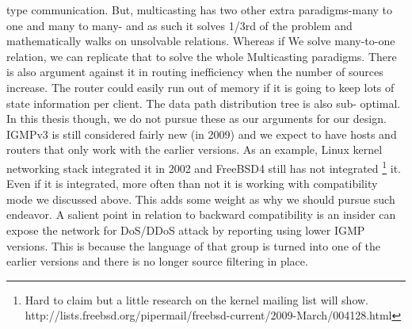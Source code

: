 \documentclass[11pt,left=2cm,bottom=2cm,oneside]{book}
\begin{document}
type communication. But, multicasting has two other extra paradigms-many to
one and many to many- and as such it solves 1/3rd of the problem and mathematically walks on unsolvable relations. Whereas if We solve many-to-one relation, we can replicate that to solve the whole Multicasting paradigms.
There is also argument against it in routing inefficiency when the number of
sources increase. The router could easily run out of memory if it is going to
keep
lots of state information per client. The data path distribution tree is also
sub-
optimal. In this thesis though, we do not pursue these as our arguments for
our
design. IGMPv3 is still considered fairly new (in 2009) and we expect to have
hosts and routers that only work with the earlier versions. As an example,
Linux
kernel networking stack integrated it in 2002 and FreeBSD4 still has not
integrated
\footnote{Hard to claim but a little research on the kernel mailing list will show.
http://lists.freebsd.org/pipermail/freebsd-current/2009-March/004128.html}
it. Even if it is integrated, more often than not it is working with
compatibility
mode we discussed above. This adds some weight as why we should pursue such
endeavor.
A salient point in relation to backward compatibility is an insider can expose
the network for DoS/DDoS attack by reporting using lower IGMP versions. This
is because the language of that group is turned into one of the earlier
versions and
there is no longer source filtering in place.
\end{document}

